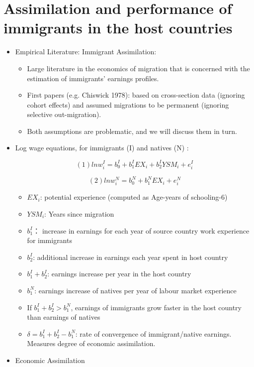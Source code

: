 \section{Assimilation and performance of immigrants in the host countries}
\begin{itemize}
\item Empirical Literature: Immigrant Assimilation:

\begin{itemize}
\item Large literature in the economics of migration that is concerned with the estimation of immigrants’ earnings profiles.
\item First papers (e.g. Chiswick 1978): based on cross-section data (ignoring 
cohort effects) and assumed migrations to be permanent (ignoring selective out-migration).
\item Both assumptions are problematic, and we will discuss them in turn.
\end{itemize}

\item Log wage equations, for immigrants (I) and natives (N) :

$$(1)      lnw_i  ^I=b_0^I+b_1^IEX_i+b_2^IYSM_i+e_i^I$$

$$(2)      lnw_i  ^N=b_0^N+b_1^NEX_i+e_i^N$$

\begin{itemize}

\item $EX_i$: potential experience (computed as Age-years of schooling-6)
\item $YSM_i$: Years since migration
\item $b_1^I$： increase in earnings for each year of source country work experience for immigrants
\item $b_2^I$: additional increase in earnings each year spent in host country
\item $b_1^I+b_2^I$: earnings increase per year in the host country
\item $b_1^N$: earnings increase of natives per year of labour market experience
\item If $b_1^I+b_2^I > b_1^N$, earnings of immigrants grow faster in the host country than earnings of natives
\item $\delta=b_1^I+b_2^I-b_1^N$: rate of convergence of immigrant/native earnings. Measures degree of economic assimilation.
\end{itemize}

\item Economic Assimilation


\end{itemize}
